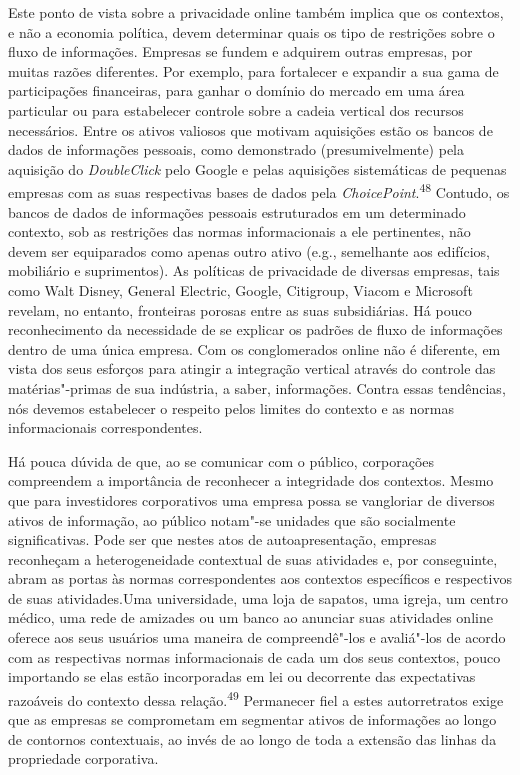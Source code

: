 Este ponto de vista sobre a privacidade online também implica que os
contextos, e não a economia política, devem determinar quais os tipo de
restrições sobre o fluxo de informações. Empresas se fundem e adquirem
outras empresas, por muitas razões diferentes. Por exemplo, para
fortalecer e expandir a sua gama de participações financeiras, para
ganhar o domínio do mercado em uma área particular ou para estabelecer
controle sobre a cadeia vertical dos recursos necessários. Entre os
ativos valiosos que motivam aquisições estão os bancos de dados de
informações pessoais, como demonstrado (presumivelmente) pela aquisição
do \emph{DoubleClick} pelo Google e pelas aquisições sistemáticas de
pequenas empresas com as suas respectivas bases de dados pela
\emph{ChoicePoint}.\textsuperscript{{48}} Contudo, os bancos de dados de
informações pessoais estruturados em um determinado contexto, sob as
restrições das normas informacionais a ele pertinentes, não devem ser
equiparados como apenas outro ativo (e.g., semelhante aos edifícios,
mobiliário e suprimentos). As políticas de privacidade de diversas
empresas, tais como Walt Disney, General Electric, Google, Citigroup,
Viacom e Microsoft revelam, no entanto, fronteiras porosas entre as suas
subsidiárias. Há pouco reconhecimento da necessidade de se explicar os
padrões de fluxo de informações dentro de uma única empresa. Com os
conglomerados online não é diferente, em vista dos seus esforços para
atingir a integração vertical através do controle das matérias"-primas de
sua indústria, a saber, informações. Contra essas tendências, nós
devemos estabelecer o respeito pelos limites do contexto e as normas
informacionais correspondentes.

Há pouca dúvida de que, ao se comunicar com o público, corporações
compreendem a importância de reconhecer a integridade dos contextos.
Mesmo que para investidores corporativos uma empresa possa se vangloriar
de diversos ativos de informação, ao público notam"-se unidades que são
socialmente significativas. Pode ser que nestes atos de
autoapresentação, empresas reconheçam a heterogeneidade contextual de
suas atividades e, por conseguinte, abram as portas às normas
correspondentes aos contextos específicos e respectivos de suas
atividades.Uma universidade, uma loja de sapatos, uma igreja, um centro
médico, uma rede de amizades ou um banco ao anunciar suas atividades
online oferece aos seus usuários uma maneira de compreendê"-los e
avaliá"-los de acordo com as respectivas normas informacionais de cada um
dos seus contextos, pouco importando se elas estão incorporadas em lei
ou decorrente das expectativas razoáveis do contexto dessa
relação.\textsuperscript{{49}} Permanecer fiel a estes autorretratos
exige que as empresas se comprometam em segmentar ativos de informações
ao longo de contornos contextuais, ao invés de ao longo de toda a
extensão das linhas da propriedade corporativa.

